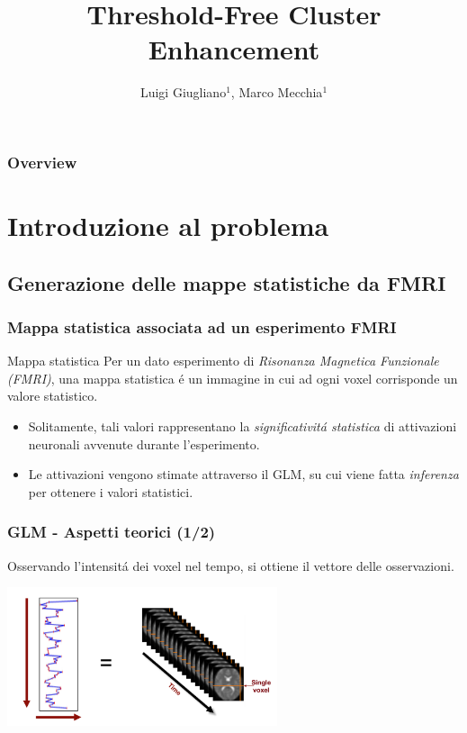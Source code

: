 \documentclass{beamer}
\title{Threshold-Free Cluster Enhancement}
\author{Luigi Giugliano$^1$, Marco Mecchia$^1$}
\institute{$^1$Universit\'a  degli studi di Salerno}
\begin{document}
\begin{frame}
   \maketitle
\end{frame}

\begin{frame}
  \frametitle{Overview}
  \footnotesize \tableofcontents
\end{frame}


\section{Introduzione al problema}

\subsection{Generazione delle mappe statistiche da FMRI}

\begin{frame}
\frametitle{Mappa statistica associata ad un esperimento FMRI}
\begin{block}{Mappa statistica}
Per un dato esperimento di \emph{Risonanza Magnetica Funzionale (FMRI)}, una \alert{mappa statistica} \'e un immagine in cui ad ogni voxel corrisponde un valore statistico.
\end{block}
\begin{itemize}
\item Solitamente, tali valori rappresentano la \emph{significativit\'a statistica} di attivazioni neuronali avvenute durante l'esperimento.
\item Le attivazioni vengono stimate attraverso il \alert{GLM}, su cui viene fatta \emph{inferenza} per ottenere i valori statistici.
\end{itemize}
\end{frame}

\begin{frame}
\frametitle{GLM - Aspetti teorici (1/2)}
Osservando l'intensit\'a dei voxel nel tempo, si ottiene il \alert{vettore delle osservazioni}.

\includegraphics[keepaspectratio, width = 300px	]{Images/glm_matrix.png}
\end{frame}
\end{document}
